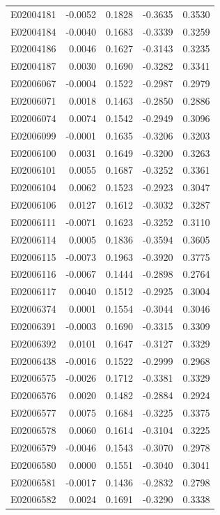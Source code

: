 \documentclass[11pt, a4paper]{article}
\begin{document}
\begin{longtable}{lrrrr}
E02004181 & -0.0052 & 0.1828 & -0.3635 & 0.3530 \\
E02004184 & -0.0040 & 0.1683 & -0.3339 & 0.3259 \\
E02004186 & 0.0046 & 0.1627 & -0.3143 & 0.3235 \\
E02004187 & 0.0030 & 0.1690 & -0.3282 & 0.3341 \\
E02006067 & -0.0004 & 0.1522 & -0.2987 & 0.2979 \\
E02006071 & 0.0018 & 0.1463 & -0.2850 & 0.2886 \\
E02006074 & 0.0074 & 0.1542 & -0.2949 & 0.3096 \\
E02006099 & -0.0001 & 0.1635 & -0.3206 & 0.3203 \\
E02006100 & 0.0031 & 0.1649 & -0.3200 & 0.3263 \\
E02006101 & 0.0055 & 0.1687 & -0.3252 & 0.3361 \\
E02006104 & 0.0062 & 0.1523 & -0.2923 & 0.3047 \\
E02006106 & 0.0127 & 0.1612 & -0.3032 & 0.3287 \\
E02006111 & -0.0071 & 0.1623 & -0.3252 & 0.3110 \\
E02006114 & 0.0005 & 0.1836 & -0.3594 & 0.3605 \\
E02006115 & -0.0073 & 0.1963 & -0.3920 & 0.3775 \\
E02006116 & -0.0067 & 0.1444 & -0.2898 & 0.2764 \\
E02006117 & 0.0040 & 0.1512 & -0.2925 & 0.3004 \\
E02006374 & 0.0001 & 0.1554 & -0.3044 & 0.3046 \\
E02006391 & -0.0003 & 0.1690 & -0.3315 & 0.3309 \\
E02006392 & 0.0101 & 0.1647 & -0.3127 & 0.3329 \\
E02006438 & -0.0016 & 0.1522 & -0.2999 & 0.2968 \\
E02006575 & -0.0026 & 0.1712 & -0.3381 & 0.3329 \\
E02006576 & 0.0020 & 0.1482 & -0.2884 & 0.2924 \\
E02006577 & 0.0075 & 0.1684 & -0.3225 & 0.3375 \\
E02006578 & 0.0060 & 0.1614 & -0.3104 & 0.3225 \\
E02006579 & -0.0046 & 0.1543 & -0.3070 & 0.2978 \\
E02006580 & 0.0000 & 0.1551 & -0.3040 & 0.3041 \\
E02006581 & -0.0017 & 0.1436 & -0.2832 & 0.2798 \\
E02006582 & 0.0024 & 0.1691 & -0.3290 & 0.3338 \\

\end{longtable}
\end{document}
